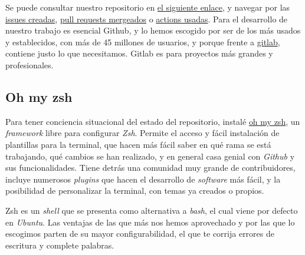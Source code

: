 Se puede consultar nuestro repositorio en \href{https://github.com/ElenaMerelo/TFG}{el siguiente enlace}, y navegar 
por las \href{https://github.com/ElenaMerelo/TFG/issues}{issues creadas}, \href{https://github.com/ElenaMerelo/TFG/pulls}{pull requests mergeados} 
o \href{https://github.com/ElenaMerelo/TFG/actions}{actions usadas}. Para el desarrollo de nuestro trabajo es esencial 
Github, y lo hemos escogido por ser de los más usados y establecidos, con más de 45 millones de usuarios, 
y porque frente a \href{https://about.gitlab.com/}{gitlab}, contiene justo lo que necesitamos. Gitlab es para proyectos 
más grandes y profesionales.

\subsection{Oh my zsh}
Para tener conciencia situacional del estado del repositorio, instalé \href{https://ohmyz.sh/}{oh my zsh}, 
un \textit{framework} libre para configurar \textit{Zsh}. Permite el acceso y fácil instalación de plantillas para 
la terminal, que hacen más fácil saber en qué rama se está trabajando, qué cambios se han realizado, y en 
general casa genial con \textit{Github} y sus funcionalidades. Tiene detrás una comunidad muy grande de 
contribuidores, incluye numerosos \textit{plugins} que hacen el desarrollo de \textit{software} más fácil, 
y la posibilidad de personalizar la terminal, con temas ya creados o propios.

{Zsh} es un \textit{shell} que se presenta como alternativa a \textit{bash}, el cual viene por defecto en 
\textit{Ubuntu}. Las ventajas de las que más nos hemos aprovechado y por las que lo escogimos parten de 
su mayor configurabilidad, el que te corrija errores de escritura y complete palabras.

